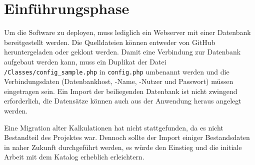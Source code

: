 \section{Einführungsphase}
\label{sec:Einfuehrungsphase}
Um die Software zu deployen, muss lediglich ein Webserver mit
einer Datenbank bereitgestellt werden. Die Quelldateien können entweder von
GitHub heruntergeladen oder geklont werden. Damit eine Verbindung zur Datenbank
aufgebaut werden kann, muss ein Duplikat der Datei
\texttt{/Classes/config\_sample.php} in \texttt{config.php} umbenannt werden und
die Verbindungsdaten (Datenbankhost, -Name, -Nutzer und Passwort) müssen
eingetragen sein. Ein Import der beiliegenden Datenbank ist nicht zwingend
erforderlich, die Datensätze können auch aus der Anwendung heraus angelegt
werden.

Eine Migration alter Kalkulationen hat nicht stattgefunden, da es nicht
Bestandteil des Projektes war. Dennoch sollte der Import einiger Bestandsdaten
in naher Zukunft durchgeführt werden, es würde den Einstieg und die initiale
Arbeit mit dem Katalog erheblich erleichtern.
